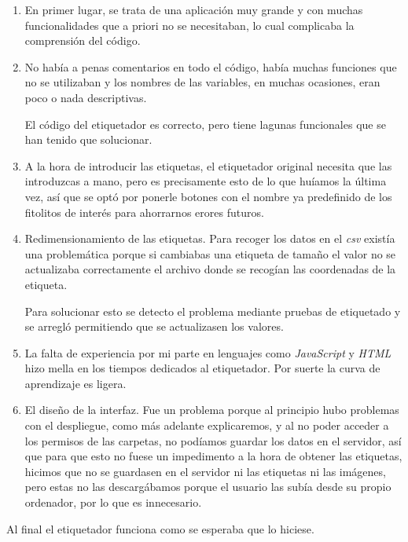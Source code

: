 \begin{enumerate}
	\item En primer lugar, se trata de una aplicación muy grande y con muchas funcionalidades que a priori no se necesitaban, lo cual complicaba la comprensión del código.
	
	\item No había a penas comentarios en todo el código, había muchas funciones que no se utilizaban y los nombres de las variables, en muchas ocasiones, eran poco o nada descriptivas. 
	
	El código del etiquetador es correcto, pero tiene lagunas funcionales que se han tenido que solucionar.
	
	\item A la hora de introducir las etiquetas, el etiquetador original necesita que las introduzcas a mano, pero es precisamente esto de lo que huíamos la última vez, así que se optó por ponerle botones con el nombre ya predefinido de los fitolitos de interés para ahorrarnos erores futuros.
	
	\item Redimensionamiento de las etiquetas. Para recoger los datos en el \textit{csv} existía una problemática porque si cambiabas una etiqueta de tamaño el valor no se actualizaba correctamente el archivo donde se recogían las coordenadas de la etiqueta.
	
	Para solucionar esto se detecto el problema mediante pruebas de etiquetado y se arregló permitiendo que se actualizasen los valores.
	
	\item La falta de experiencia por mi parte en lenguajes como \textit{JavaScript} y \textit{HTML} hizo mella en los tiempos dedicados al etiquetador. Por suerte la curva de aprendizaje es ligera.
	
	\item El diseño de la interfaz. Fue un problema porque al principio hubo problemas con el despliegue, como más adelante explicaremos, y al no poder acceder a los permisos de las carpetas, no podíamos guardar los datos en el servidor, así que para que esto no fuese un impedimento a la hora de obtener las etiquetas, hicimos que no se guardasen en el servidor ni las etiquetas ni las imágenes, pero estas no las descargábamos porque el usuario las subía desde su propio ordenador, por lo que es innecesario.
\end{enumerate}

Al final el etiquetador funciona como se esperaba que lo hiciese.

